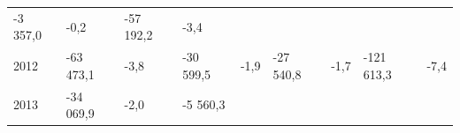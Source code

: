 \begin{longtable}[]{@{}lllllllll@{}}
\begin{minipage}[t]{0.12\columnwidth}
-3 357,0\strut
\end{minipage} & \begin{minipage}[t]{0.06\columnwidth}\raggedright
-0,2\strut
\end{minipage} & \begin{minipage}[t]{0.09\columnwidth}\raggedright
-57 192,2\strut
\end{minipage} & \begin{minipage}[t]{0.06\columnwidth}\raggedright
-3,4\strut
\end{minipage}\tabularnewline
\begin{minipage}[t]{0.05\columnwidth}\raggedright
2012\strut
\end{minipage} & \begin{minipage}[t]{0.10\columnwidth}\raggedright
-63 473,1\strut
\end{minipage} & \begin{minipage}[t]{0.06\columnwidth}\raggedright
-3,8\strut
\end{minipage} & \begin{minipage}[t]{0.16\columnwidth}\raggedright
-30 599,5\strut
\end{minipage} & \begin{minipage}[t]{0.06\columnwidth}\raggedright
-1,9\strut
\end{minipage} & \begin{minipage}[t]{0.12\columnwidth}\raggedright
-27 540,8\strut
\end{minipage} & \begin{minipage}[t]{0.06\columnwidth}\raggedright
-1,7\strut
\end{minipage} & \begin{minipage}[t]{0.09\columnwidth}\raggedright
-121 613,3\strut
\end{minipage} & \begin{minipage}[t]{0.06\columnwidth}\raggedright
-7,4\strut
\end{minipage}\tabularnewline
\begin{minipage}[t]{0.05\columnwidth}\raggedright
2013\strut
\end{minipage} & \begin{minipage}[t]{0.10\columnwidth}\raggedright
-34 069,9\strut
\end{minipage} & \begin{minipage}[t]{0.06\columnwidth}\raggedright
-2,0\strut
\end{minipage} & \begin{minipage}[t]{0.16\columnwidth}\raggedright
-5 560,3\strut

\end{minipage}
\end{longtable}
